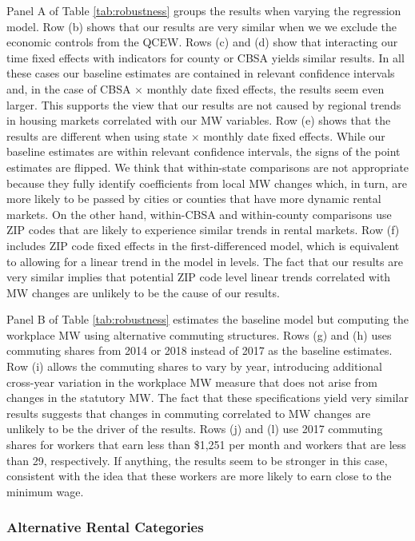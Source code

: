 Panel A of Table \ref{tab:robustness} groups the results when varying the 
regression model.
Row (b) shows that our results are very similar when we we exclude the 
economic controls from the QCEW.
Rows (c) and (d) show that interacting our time fixed effects with indicators 
for county or CBSA yields similar results.
In all these cases our baseline estimates are contained in relevant 
confidence intervals and, in the case of CBSA $\times$ monthly date fixed 
effects, the results seem even larger.
This supports the view that our results are not caused by regional trends 
in housing markets correlated with our MW variables.
Row (e) shows that the results are different when using state $\times$ 
monthly date fixed effects.
While our baseline estimates are within relevant confidence intervals, the 
signs of the point estimates are flipped.
We think that within-state comparisons are not appropriate because they fully 
identify coefficients from local MW changes which, in turn, are more likely to 
be passed by cities or counties that have more dynamic rental markets.
On the other hand, within-CBSA and within-county comparisons use ZIP codes that
are likely to experience similar trends in rental markets.
Row (f) includes ZIP code fixed effects in the first-differenced model, which
is equivalent to allowing for a linear trend in the model in levels.
The fact that our results are very similar implies that potential ZIP code 
level linear trends correlated with MW changes are unlikely to be the cause
of our results.

Panel B of Table \ref{tab:robustness} estimates the baseline model but 
computing the workplace MW using alternative commuting structures.
Rows (g) and (h) uses commuting shares from 2014 or 2018 instead of 2017 as 
the baseline estimates.
Row (i) allows the commuting shares to vary by year, introducing additional
cross-year variation in the workplace MW measure that does not arise from 
changes in the statutory MW.
The fact that these specifications yield very similar results suggests that 
changes in commuting correlated to MW changes are unlikely to be the driver
of the results.
Rows (j) and (l) use 2017 commuting shares for workers that earn less than 
\$1,251 per month and workers that are less than 29, respectively.
If anything, the results seem to be stronger in this case, consistent
with the idea that these workers are more likely to earn close to the 
minimum wage.

\subsubsection*{Alternative Rental Categories}

